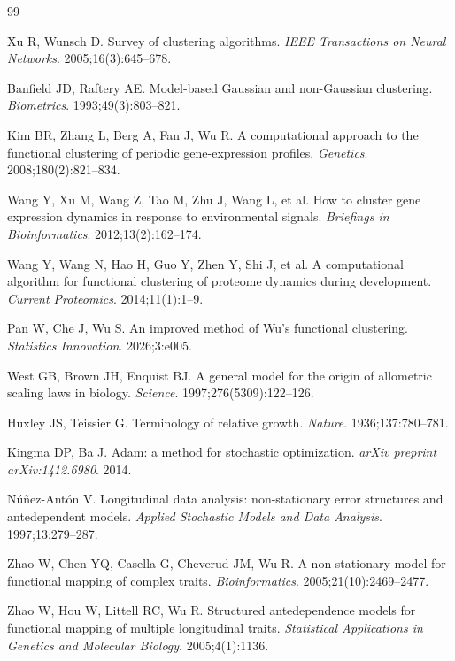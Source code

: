\documentclass[12pt,a4paper]{article}
\begin{document}
\begin{thebibliography}{99}

Xu R, Wunsch D. Survey of clustering algorithms. \textit{IEEE Transactions on Neural Networks}. 2005;16(3):645--678.

Banfield JD, Raftery AE. Model-based Gaussian and non-Gaussian clustering. \textit{Biometrics}. 1993;49(3):803--821.

Kim BR, Zhang L, Berg A, Fan J, Wu R. A computational approach to the functional clustering of periodic gene-expression profiles. \textit{Genetics}. 2008;180(2):821--834.

Wang Y, Xu M, Wang Z, Tao M, Zhu J, Wang L, et al. How to cluster gene expression dynamics in response to environmental signals. \textit{Briefings in Bioinformatics}. 2012;13(2):162--174.

Wang Y, Wang N, Hao H, Guo Y, Zhen Y, Shi J, et al. A computational algorithm for functional clustering of proteome dynamics during development. \textit{Current Proteomics}. 2014;11(1):1--9.

Pan W, Che J, Wu S. An improved method of Wu's functional clustering. \textit{Statistics Innovation}. 2026;3:e005.

West GB, Brown JH, Enquist BJ. A general model for the origin of allometric scaling laws in biology. \textit{Science}. 1997;276(5309):122--126.

Huxley JS, Teissier G. Terminology of relative growth. \textit{Nature}. 1936;137:780--781.

Kingma DP, Ba J. Adam: a method for stochastic optimization. \textit{arXiv preprint arXiv:1412.6980}. 2014.

N\'{u}\~{n}ez-Ant\'{o}n V. Longitudinal data analysis: non-stationary error structures and antedependent models. \textit{Applied Stochastic Models and Data Analysis}. 1997;13:279--287.

Zhao W, Chen YQ, Casella G, Cheverud JM, Wu R. A non-stationary model for functional mapping of complex traits. \textit{Bioinformatics}. 2005;21(10):2469--2477.

Zhao W, Hou W, Littell RC, Wu R. Structured antedependence models for functional mapping of multiple longitudinal traits. \textit{Statistical Applications in Genetics and Molecular Biology}. 2005;4(1):1136.


\end{thebibliography}
\end{document}
